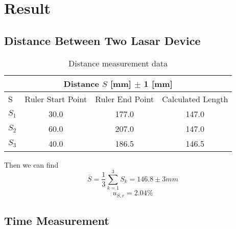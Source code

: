 \section{Result}
\subsection{Distance Between Two Lasar Device}

\begin{table}[H]
  \centering
  \begin{tabular}{|l|c |c |c |}
    \hline
    \multicolumn{4}{|c|}{Distance $S$ [mm] $\pm$ 1 [mm]} \\
    \hline
    S &  Ruler Start Point & Ruler End Point & Calculated Length \\
    \hline
    $S_1$ & 30.0 & 177.0 & 147.0 \\ 
    \hline
    $S_2$ & 60.0 & 207.0 & 147.0 \\ 
    \hline
    $S_3$ & 40.0 & 186.5 & 146.5 \\ 
    \hline
  \end{tabular}
  \caption{Distance measurement data}
\end{table}

Then we can find
$$  \bar{S} = \frac{1}{3} \sum_{k=1}^{3} S_k = 146.8 \pm 3 mm   $$
$$  u_{S,r} = 2.04 \%  $$ 


\subsection{Time Measurement}





